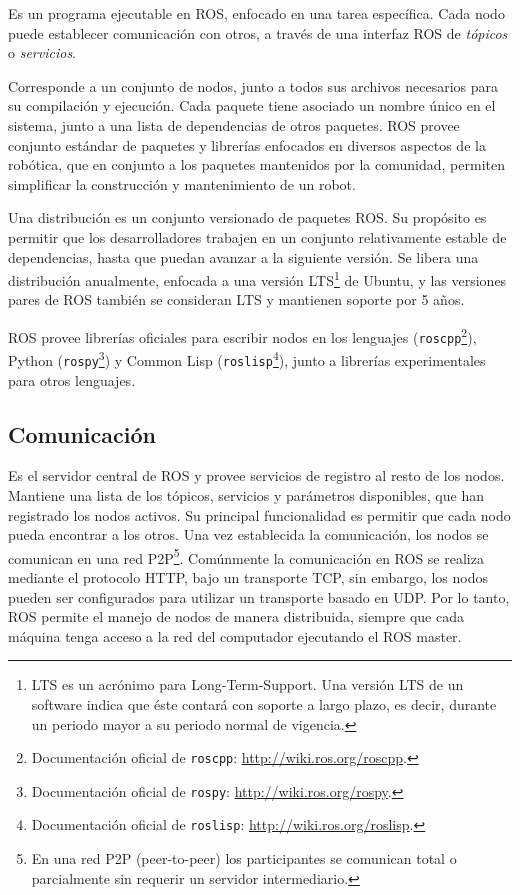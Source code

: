 Es un programa ejecutable en ROS, enfocado en una tarea específica. Cada nodo puede establecer comunicación con otros, a través de una interfaz ROS de \textit{tópicos} o \textit{servicios}.

Corresponde a un conjunto de nodos, junto a todos sus archivos necesarios para su compilación y ejecución. Cada paquete tiene asociado un nombre único en el sistema, junto a una lista de dependencias de otros paquetes. ROS provee conjunto estándar de paquetes y librerías enfocados en diversos aspectos de la robótica, que en conjunto a los paquetes mantenidos por la comunidad, permiten simplificar la construcción y mantenimiento de un robot.

Una distribución es un conjunto versionado de paquetes ROS. Su propósito es permitir que los desarrolladores trabajen en un conjunto relativamente estable de dependencias, hasta que puedan avanzar a la siguiente versión. Se libera una distribución anualmente, enfocada a una versión  LTS\footnote{LTS es un acrónimo para Long-Term-Support. Una versión LTS de un software indica que éste contará con soporte a largo plazo, es decir, durante un periodo mayor a su periodo normal de vigencia.} de Ubuntu, y las versiones pares de ROS también se consideran LTS y mantienen soporte por 5 años.

 ROS provee librerías oficiales para escribir nodos en los lenguajes \CC (\texttt{roscpp}\footnote{Documentación oficial de \texttt{roscpp}: \url{http://wiki.ros.org/roscpp}.}), Python (\texttt{rospy}\footnote{Documentación oficial de \texttt{rospy}: \url{http://wiki.ros.org/rospy}.}) y Common Lisp (\texttt{roslisp}\footnote{Documentación oficial de \texttt{roslisp}: \url{http://wiki.ros.org/roslisp}.}), junto a librerías experimentales para otros lenguajes.

\subsection{Comunicación}

 Es el servidor central de ROS y provee servicios de registro al resto de los nodos. Mantiene una lista de los tópicos, servicios y parámetros disponibles, que han registrado los nodos activos. Su principal funcionalidad es permitir que cada nodo pueda encontrar a los otros. Una vez establecida la comunicación, los nodos se comunican en una red P2P\footnote{En una red P2P (peer-to-peer) los participantes se comunican total o parcialmente sin requerir un servidor intermediario.}. Comúnmente la comunicación en ROS se realiza mediante el protocolo HTTP, bajo un transporte TCP, sin embargo, los nodos pueden ser configurados para utilizar un transporte basado en UDP. Por lo tanto, ROS permite el manejo de nodos de manera distribuida, siempre que cada máquina tenga acceso a la red del computador ejecutando el ROS master.

